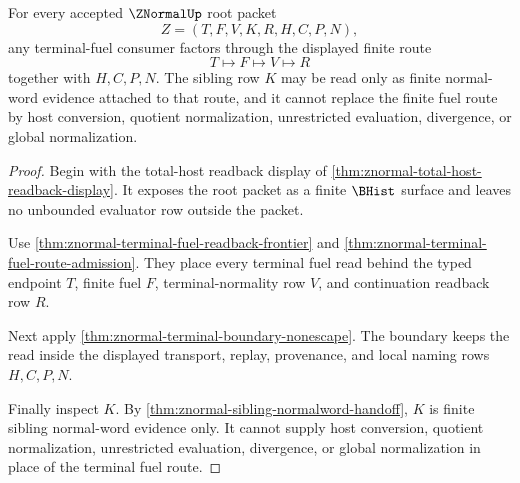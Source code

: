 \begin{theorem}
\label{thm:znormal-terminal-fuel-route-exhaustion}
For every accepted $\ZNormalUp$ root packet
$$
Z=(T,F,V,K,R,H,C,P,N),
$$
any terminal-fuel consumer factors through the displayed finite route
$$
T \longmapsto F \longmapsto V \longmapsto R
$$
together with $H,C,P,N$. The sibling row $K$ may be read only as finite normal-word evidence attached to that route, and it cannot replace the finite fuel route by host conversion, quotient normalization, unrestricted evaluation, divergence, or global normalization.
\end{theorem}
\begin{proof}
Begin with the total-host readback display of \autoref{thm:znormal-total-host-readback-display}. It exposes the root packet as a finite $\BHist$ surface and leaves no unbounded evaluator row outside the packet.

Use \autoref{thm:znormal-terminal-fuel-readback-frontier} and \autoref{thm:znormal-terminal-fuel-route-admission}. They place every terminal fuel read behind the typed endpoint $T$, finite fuel $F$, terminal-normality row $V$, and continuation readback row $R$.

Next apply \autoref{thm:znormal-terminal-boundary-nonescape}. The boundary keeps the read inside the displayed transport, replay, provenance, and local naming rows $H,C,P,N$.

Finally inspect $K$. By \autoref{thm:znormal-sibling-normalword-handoff}, $K$ is finite sibling normal-word evidence only. It cannot supply host conversion, quotient normalization, unrestricted evaluation, divergence, or global normalization in place of the terminal fuel route.
\end{proof}

